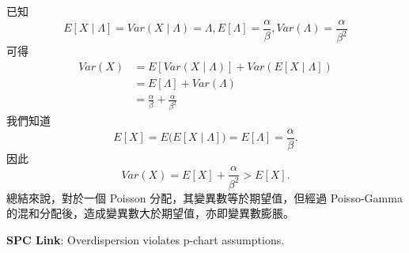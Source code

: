 \documentclass[a4paper, 12pt]{article}  %
\begin{document}
\begin{enumerate}
        已知 $$E[X \mid \Lambda]=Var(X \mid \Lambda)=\Lambda,　E[\Lambda]=\frac{\alpha}{\beta},　Var(\Lambda)=\frac{\alpha}{\beta^{2}}$$
        可得
        \begin{align*}
            Var(X)
            &=E\left[Var(X\mid \Lambda)\right]+Var\left(E[X\mid \Lambda]\right) \\
            &=E[\Lambda]+Var(\Lambda) \\
            &=\frac{\alpha}{\beta}+\frac{\alpha}{\beta^{2}}
        \end{align*}
        我們知道
        $$E[X]=E\big(E[X \mid \Lambda]\big)=E[\Lambda]=\frac{\alpha}{\beta}.$$
        因此
        $$Var(X)=E[X]+\frac{\alpha}{\beta^{2}}>E[X].$$
        總結來說，對於一個 Poisson 分配，其變異數等於期望值，但經過 Poisso-Gamma 的混和分配後，造成變異數大於期望值，亦即變異數膨脹。
    \end{enumerate}

    \textbf{SPC Link}: Overdispersion violates p-chart assumptions.
\end{document}
